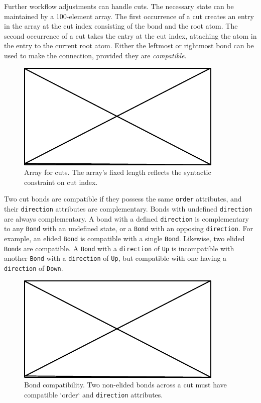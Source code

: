 \documentclass{article}
\def\ttt{\texttt}
\begin{document}
Further workflow adjustments can handle cuts. The necessary state can be maintained by a 100-element array. The first occurrence of a cut creates an entry in the array at the cut index consisting of the bond and the root atom. The second occurrence of a cut takes the entry at the cut index, attaching the atom in the entry to the current root atom. Either the leftmost or rightmost bond can be used to make the connection, provided they are \textit{compatible}.

\begin{figure}
    \centering
    \includegraphics{filler}
    \caption{Array for cuts. The array's fixed length reflects the syntactic constraint on cut index.}
    \label{fig:cuts-array}
\end{figure}

Two cut bonds are compatible if they possess the same \ttt{order} attributes, and their \ttt{direction} attributes are complementary. Bonds with undefined \ttt{direction} are always complementary. A bond with a defined \ttt{direction} is complementary to any \ttt{Bond} with an undefined state, or a \ttt{Bond} with an opposing \ttt{direction}. For example, an elided \ttt{Bond} is compatible with a single \ttt{Bond}. Likewise, two elided \ttt{Bond}s are compatible. A \ttt{Bond} with a \ttt{direction} of \ttt{Up} is incompatible with another \ttt{Bond} with a \ttt{direction} of \ttt{Up}, but compatible with one having a \ttt{direction} of \ttt{Down}.

\begin{figure}
    \centering
    \includegraphics{filler}
    \caption{Bond compatibility. Two non-elided bonds across a cut must have compatible `order` and \ttt{direction} attributes.}
    \label{fig:bond-compatibility}
\end{figure}
\end{document}
